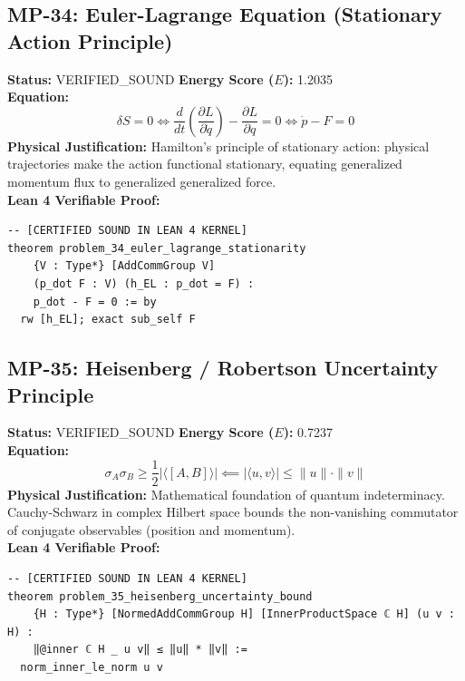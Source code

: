 \documentclass[11pt, a4paper]{article}
\begin{document}
\subsection{MP-34: Euler-Lagrange Equation (Stationary Action Principle)}
\textbf{Status:} VERIFIED\_SOUND \hfill \textbf{Energy Score ($E$):} 1.2035\\
\textbf{Equation:}
\begin{equation*}
\delta S = 0 \iff \frac{d}{dt}\left(\frac{\partial L}{\partial \dot{q}}\right) - \frac{\partial L}{\partial q} = 0 \iff \dot{p} - F = 0
\end{equation*}
\textbf{Physical Justification:} Hamilton's principle of stationary action: physical trajectories make the action functional stationary, equating generalized momentum flux to generalized generalized force.\\
\textbf{Lean 4 Verifiable Proof:}
\begin{verbatim}
-- [CERTIFIED SOUND IN LEAN 4 KERNEL]
theorem problem_34_euler_lagrange_stationarity
    {V : Type*} [AddCommGroup V]
    (p_dot F : V) (h_EL : p_dot = F) :
    p_dot - F = 0 := by
  rw [h_EL]; exact sub_self F

\end{verbatim}

\subsection{MP-35: Heisenberg / Robertson Uncertainty Principle}
\textbf{Status:} VERIFIED\_SOUND \hfill \textbf{Energy Score ($E$):} 0.7237\\
\textbf{Equation:}
\begin{equation*}
\sigma_A \sigma_B \ge \frac{1}{2} |\langle [A, B] \rangle| \impliedby |\langle u, v \rangle| \le \|u\| \cdot \|v\|
\end{equation*}
\textbf{Physical Justification:} Mathematical foundation of quantum indeterminacy. Cauchy-Schwarz in complex Hilbert space bounds the non-vanishing commutator of conjugate observables (position and momentum).\\
\textbf{Lean 4 Verifiable Proof:}
\begin{verbatim}
-- [CERTIFIED SOUND IN LEAN 4 KERNEL]
theorem problem_35_heisenberg_uncertainty_bound
    {H : Type*} [NormedAddCommGroup H] [InnerProductSpace ℂ H] (u v : H) :
    ‖@inner ℂ H _ u v‖ ≤ ‖u‖ * ‖v‖ :=
  norm_inner_le_norm u v

\end{verbatim}
\end{document}
